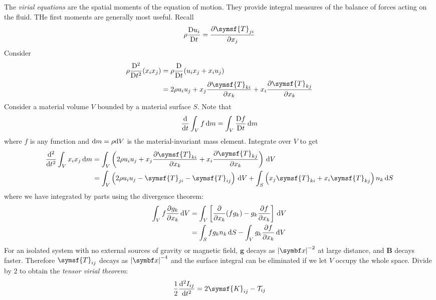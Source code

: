 \documentclass{jknotes}
\newcommand{\B}{\symbf{B}}
\begin{document}
The \emph{virial equations} are the spatial moments of the equation of motion.
They provide integral measures of the balance of forces acting on the fluid.
THe first moments are generally most useful. Recall
\begin{equation}
	\rho \frac{\diffD u_i}{\diffD t} = \frac{\partial \symsf{T}_{ji}}{\partial
	x_j}
\end{equation}
Consider
\begin{align}
	\rho \frac{\diffD^2}{\diffD t^2} (x_i x_j) &= \rho \frac{\diffD}{\diffD
	t}(u_i x_j + x_i u_j) \\
	&= 2 \rho u_i u_j + x_j \frac{\partial \symsf{T}_{ki}}{\partial x_k} + x_i
	\frac{\partial \symsf{T}_{kj}}{\partial x_k}
\end{align}
Consider a material volume $V$ bounded by a material surface $S$. Note that
\begin{equation}
	\frac{\diffd }{\diffd t} \int_V f \, \diffd m = \int_V \frac{\diffD
	f}{\diffD t} \, \diffd m
\end{equation}
where $f$ is any function and $\diffd m = \rho \diffd V$ is the
material-invariant mass element. Integrate over $V$ to get
\begin{align}
	 \frac{\diffd^2}{\diffd t^2} \int_V x_i x_j\,\diffd m
	 &= \int_V \left(2 \rho u_i u_j + x_j \frac{\partial
	 \symsf{T}_{ki}}{\partial x_k} + x_i \frac{\partial
 	\symsf{T}_{kj}}{\partial x_k}\right) \, \diffd V \\
	 &= \int_V \left( 2 \rho u_i u_j - \symsf{T}_{ji} - \symsf{T}_{ij}\right)
	 \, \diffd V + \int_S \left( x_j \symsf{T}_{ki} + x_i
 	\symsf{T}_{kj}\right)n_k \, \diffd S 
\end{align}
where we have integrated by parts using the divergence theorem:
\begin{align}
	\int_V f \frac{\partial g_k}{\partial x_k} \, \diffd V 
	&= \int_V \left[
	\frac{\partial}{\partial x_k} (fg_k) - g_k \frac{\partial f}{\partial x_k}
	\right] \, \diffd V \\
	&= \int_S f g_k n_k \, \diffd S - \int_V g_k \frac{\partial f}{\partial
	x_k} \, \diffd V
\end{align}
For an isolated system with no external sources of gravity or magnetic field,
$\symbf{g}$ decays as $\abs{\x}^{-2}$ at large distance, and $\B$ decays
faster. Therefore $\symsf{T}_{ij}$ decays as $\abs{\x}^{-4}$ and the surface
integral can be eliminated if we let $V$ occupy the whole space. Divide by $2$
to obtain the \emph{tensor virial theorem}:
\begin{equation}
	\frac{1}{2}\frac{\diffd^2 I_{ij}}{\diffd t^2}  = 2\symsf{K}_{ij} -
	\mathcal{T}_{ij}
\end{equation}
\end{document}
